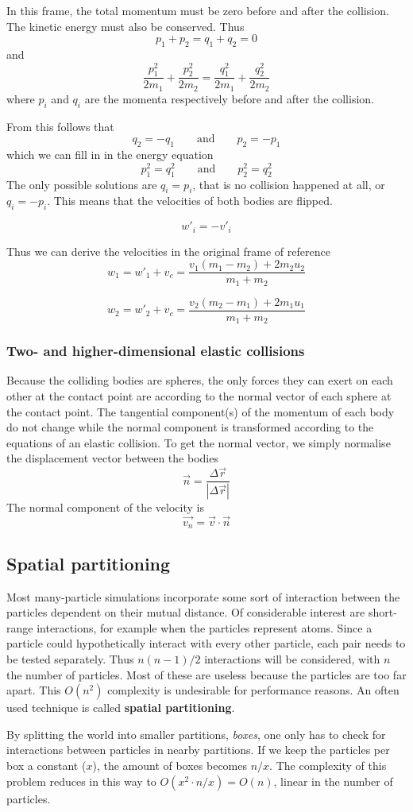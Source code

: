 In this frame, the total momentum must be zero before and after the collision.  
The kinetic energy must also be conserved.
Thus
$$
p_1 + p_2 = q_1 + q_2 = 0
$$
and
$$
\frac{p_1^2}{2m_1} + \frac{p_2^2}{2m_2} = \frac{q_1^2}{2m_1} + 
\frac{q_2^2}{2m_2}
$$
where $p_i$ and $q_i$ are the momenta respectively before and after the 
collision.

From this follows that
$$
q_2 = -q_1 \qquad \textrm{and} \qquad p_2 = -p_1
$$
which we can fill in in the energy equation
$$
p_1^2 = q_1^2 \qquad \textrm{and} \qquad p_2^2 = q_2^2
$$
The only possible solutions are $q_i = p_i$, that is no collision happened at 
all, or $q_i = -p_i$. This means that the velocities of both bodies are 
flipped.

$$
w'_i = -v'_i
$$

Thus we can derive the velocities in the original frame of reference
$$
w_1 = w'_1 + v_c = \frac{v_1(m_1-m_2) + 2m_2u_2}{m_1+m_2}
$$

$$
w_2 = w'_2 + v_c = \frac{v_2(m_2-m_1) + 2m_1u_1}{m_1+m_2}
$$

\subsubsection{Two- and higher-dimensional elastic collisions}
Because the colliding bodies are spheres, the only forces they can exert on 
each other at the contact point are according to the normal vector of each 
sphere at the contact point. The tangential component(s) of the momentum of 
each body do not change while the normal component is transformed according to 
the equations of an elastic collision. To get the normal vector, we simply 
normalise the displacement vector between the bodies
$$
\vec{n} = \frac{\Delta\vec{r}}{|\Delta\vec{r}|}
$$
The normal component of the velocity is
$$
\vec{v_n} = \vec{v} \cdot \vec{n}
$$

\subsection{Spatial partitioning}

Most many-particle simulations incorporate some sort of interaction between the 
particles dependent on their mutual distance. Of considerable interest are 
short-range interactions, for example when the particles represent atoms. Since 
a particle could hypothetically interact with every other particle, each pair 
needs to be tested separately. Thus $n(n-1)/2$ interactions will be considered, 
with $n$ the number of particles. Most of these are useless because the 
particles are too far apart. This $O(n^2)$ complexity is undesirable for 
performance reasons. An often used technique is called \textbf{spatial 
partitioning}.

By splitting the world into smaller partitions, \emph{boxes}, one only has to 
check for interactions between particles in nearby partitions. If we keep the 
particles per box a constant ($x$), the amount of boxes becomes $n/x$. The 
complexity of this problem reduces in this way to $O(x^2 \cdot n/x) = O(n)$, 
linear in the number of particles.
